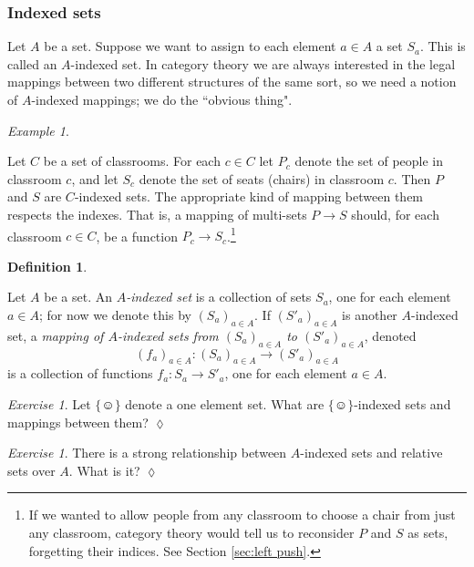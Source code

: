 \documentclass{book}
\def\singleton{\{\smiley\}}
\def\to{\rightarrow}
\def\taking{\colon}
\theoremstyle{remark}
\newtheorem{example}[subsubsection]{Example}
\newtheorem{exc}[subsubsection]{Exercise}
\newenvironment{exercise}{\begin{exc}}{\hspace*{\fill}$\lozenge$\end{exc}}
\theoremstyle{definition}
\newtheorem{definition}[subsubsection]{Definition}
\begin{document}

\subsubsection{Indexed sets}\label{sec:indexed sets}

Let $A$ be a set. Suppose we want to assign to each element $a\in A$ a set $S_a$. This is called an $A$-indexed set. In category theory we are always interested in the legal mappings between two different structures of the same sort, so we need a notion of $A$-indexed mappings; we do the ``obvious thing".

\begin{example}\label{ex:classroom seats}

Let $C$ be a set of classrooms. For each $c\in C$ let $P_c$ denote the set of people in classroom $c$, and let $S_c$ denote the set of seats (chairs) in classroom $c$. Then $P$ and $S$ are $C$-indexed sets. The appropriate kind of mapping between them respects the indexes. That is, a mapping of multi-sets $P\to S$ should, for each classroom $c\in C$, be a function $P_c\to S_c$.\footnote{If we wanted to allow people from any classroom to choose a chair from just any classroom, category theory would tell us to reconsider $P$ and $S$ as sets, forgetting their indices. See Section \ref{sec:left push}.}

\end{example}

\begin{definition}\label{def:indexed sets}

Let $A$ be a set. An {\em $A$-indexed set} is a collection of sets $S_a$, one for each element $a\in A$; for now we denote this by $(S_a)_{a\in A}$. If $(S'_a)_{a\in A}$ is another $A$-indexed set, a {\em mapping of $A$-indexed sets from $(S_a)_{a\in A}$ to $(S'_a)_{a\in A}$}, denoted $$(f_a)_{a\in A}\taking(S_a)_{a\in A}\to (S'_a)_{a\in A}$$ is a collection of functions $f_a\taking S_a\to S'_a$, one for each element $a\in A$.

\end{definition}

\begin{exercise}
Let $\singleton$ denote a one element set. What are $\singleton$-indexed sets and mappings between them?
\end{exercise}

\begin{exercise}
There is a strong relationship between $A$-indexed sets and relative sets over $A$. What is it? 
\end{exercise}
\end{document}
